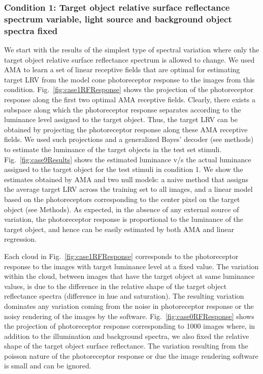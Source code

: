 \documentclass{jov}
\begin{document}
\subsubsection{Condition 1: Target object relative surface reflectance spectrum variable, light source and background object spectra fixed}
We start with the results of the simplest type of spectral variation where only the target object relative surface reflectance spectrum is allowed to change. 
We used AMA to learn a set of linear receptive fields that are optimal for estimating target LRV from the model cone photoreceptor response to the images from this condition.
Fig.~\ref{fig:case1RFResponse} shows the projection of the photoreceptor response along the first two optimal AMA receptive fields. 
Clearly, there exists a subspace along which the photoreceptor response separates according to the luminance level assigned to the target object. 
Thus, the target LRV can be obtained by projecting the photoreceptor response along these AMA receptive fields. 
We used such projections and a generalized Bayes' decoder (see methods) to estimate the luminance of the target objects in the test set stimuli. 
Fig.~\ref{fig:case9Results} shows the estimated luminance v/s the actual luminance assigned to the target object for the test stimuli in condition 1. 
We show the estimates obtained by AMA and two null models: a naive method that assigns the average target LRV across the training set to all images, and a linear model based on the photoreceptors corresponding to the center pixel on the target object (see Methods). 
As expected, in the absence of any external source of variation, the photoreceptor response is proportional to the luminance of the target object, and hence can be easily estimated by both AMA and linear regression.

Each cloud in Fig.~\ref{fig:case1RFResponse} corresponds to the photoreceptor response to the images with target luminance level at a fixed value. 
The variation within the cloud, between images that have the target object at same luminance values, is due to the difference in the relative shape of the target object reflectance spectra (difference in hue and saturation). 
The resulting variation dominates any variation coming from the noise in photoreceptor response or the noisy rendering of the images by the software.
Fig.~\ref{fig:case0RFResponse} shows the projection of photoreceptor response corresponding to 1000 images where, in addition to the illumination and background spectra, we also fixed the relative shape of the target object surface reflectance. 
The variation resulting from the poisson nature of the photoreceptor response or due the image rendering software is small and can be ignored.
\end{document}
